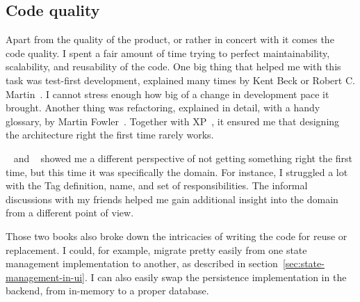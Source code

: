 \subsection{Code quality}\label{sec:code-quality}

Apart from the quality of the product,
or rather in concert with it
comes the code quality.
I spent a fair amount of time trying
to perfect maintainability,
scalability,
and reusability of the code.
One big thing that helped me with this task
was test-first development,
explained many times by Kent Beck or
Robert C. Martin~\cite{beck_extreme_2004,beck_test-driven_2002,martin_clean_2011}.
I cannot stress enough how big
of a change in development pace it brought.
Another thing was refactoring,
explained in detail,
with a handy glossary,
by Martin Fowler~\cite{fowler_refactoring_2019}.
Together with \ac{XP}~\cite{beck_extreme_2004},
it ensured me that designing the architecture right
the first time rarely works.

~\cite{millett_patterns_2015}
and ~\cite{evans_domain-driven_2003}
showed me a different perspective
of not getting something right the first time,
but this time it was specifically the domain.
For instance,
I struggled a lot with the Tag definition,
name, and set of responsibilities.
The informal discussions with my friends
helped me gain additional insight into the domain
from a different point of view.

Those two books also broke down the intricacies
of writing the code for reuse or replacement.
I could, for example,
migrate pretty easily
from one state management implementation to another,
as described in section~\ref{sec:state-management-in-ui}.
I can also easily swap
the persistence implementation in the backend,
from in-memory to a proper database.
